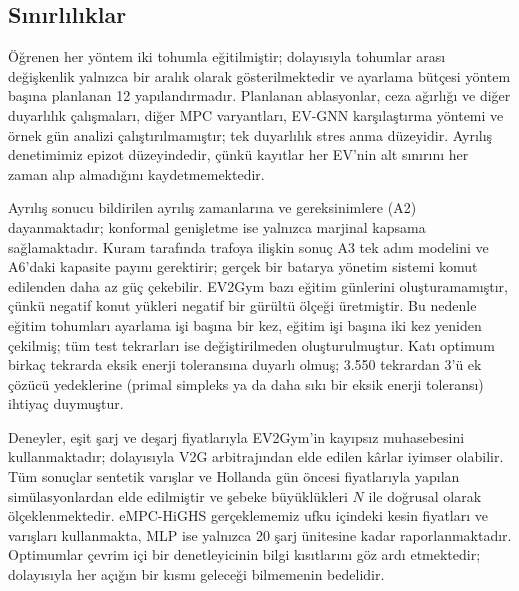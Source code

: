 \subsection{Sınırlılıklar}\label{sec:limitations}

Öğrenen her yöntem iki tohumla eğitilmiştir; dolayısıyla tohumlar arası değişkenlik yalnızca bir aralık olarak gösterilmektedir ve ayarlama bütçesi yöntem başına planlanan 12 yapılandırmadır.
Planlanan ablasyonlar, ceza ağırlığı ve diğer duyarlılık çalışmaları, diğer MPC varyantları, EV-GNN karşılaştırma yöntemi ve örnek gün analizi çalıştırılmamıştır; tek duyarlılık stres anma düzeyidir.
Ayrılış denetimimiz epizot düzeyindedir, çünkü kayıtlar her EV'nin alt sınırını her zaman alıp almadığını kaydetmemektedir.

Ayrılış sonucu bildirilen ayrılış zamanlarına ve gereksinimlere (A2) dayanmaktadır; konformal genişletme ise yalnızca marjinal kapsama sağlamaktadır.
Kuram tarafında trafoya ilişkin sonuç A3 tek adım modelini ve A6'daki kapasite payını gerektirir; gerçek bir batarya yönetim sistemi komut edilenden daha az güç çekebilir.
EV2Gym bazı eğitim günlerini oluşturamamıştır, çünkü negatif konut yükleri negatif bir gürültü ölçeği üretmiştir.
Bu nedenle eğitim tohumları ayarlama işi başına bir kez, eğitim işi başına iki kez yeniden çekilmiş; tüm test tekrarları ise değiştirilmeden oluşturulmuştur.
Katı optimum birkaç tekrarda eksik enerji toleransına duyarlı olmuş; 3.550 tekrardan 3'ü ek çözücü yedeklerine (primal simpleks ya da daha sıkı bir eksik enerji toleransı) ihtiyaç duymuştur.

Deneyler, eşit şarj ve deşarj fiyatlarıyla EV2Gym'in kayıpsız muhasebesini kullanmaktadır; dolayısıyla V2G arbitrajından elde edilen kârlar iyimser olabilir.
Tüm sonuçlar sentetik varışlar ve Hollanda gün öncesi fiyatlarıyla yapılan simülasyonlardan elde edilmiştir ve şebeke büyüklükleri $N$ ile doğrusal olarak ölçeklenmektedir.
eMPC-HiGHS gerçeklememiz ufku içindeki kesin fiyatları ve varışları kullanmakta, MLP ise yalnızca 20 şarj ünitesine kadar raporlanmaktadır.
Optimumlar çevrim içi bir denetleyicinin bilgi kısıtlarını göz ardı etmektedir; dolayısıyla her açığın bir kısmı geleceği bilmemenin bedelidir.
